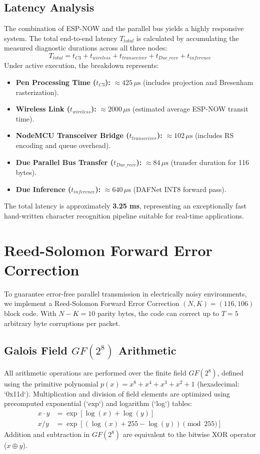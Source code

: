 \documentclass[12pt,a4paper]{article}
\begin{document}
\subsection{Latency Analysis}
The combination of ESP-NOW and the parallel bus yields a highly responsive system. The total end-to-end latency $T_{total}$ is calculated by accumulating the measured diagnostic durations across all three nodes:
\begin{equation}
    T_{total} = t_{C3} + t_{wireless} + t_{transceiver} + t_{Due\_recv} + t_{inference}
\end{equation}
Under active execution, the breakdown represents:
\begin{itemize}
    \item \textbf{Pen Processing Time ($t_{C3}$):} $\approx 425\,\mu\text{s}$ (includes projection and Bresenham rasterization).
    \item \textbf{Wireless Link ($t_{wireless}$):} $\approx 2000\,\mu\text{s}$ (estimated average ESP-NOW transit time).
    \item \textbf{NodeMCU Transceiver Bridge ($t_{transceiver}$):} $\approx 102\,\mu\text{s}$ (includes RS encoding and queue overhead).
    \item \textbf{Due Parallel Bus Transfer ($t_{Due\_recv}$):} $\approx 84\,\mu\text{s}$ (transfer duration for 116 bytes).
    \item \textbf{Due Inference ($t_{inference}$):} $\approx 640\,\mu\text{s}$ (DAFNet INT8 forward pass).
\end{itemize}
The total latency is approximately \textbf{3.25 ms}, representing an exceptionally fast hand-written character recognition pipeline suitable for real-time applications.

\section{Reed-Solomon Forward Error Correction}
To guarantee error-free parallel transmission in electrically noisy environments, we implement a Reed-Solomon Forward Error Correction $(N, K) = (116, 106)$ block code. With $N - K = 10$ parity bytes, the code can correct up to $T = 5$ arbitrary byte corruptions per packet.

\subsection{Galois Field $GF(2^8)$ Arithmetic}
All arithmetic operations are performed over the finite field $GF(2^8)$, defined using the primitive polynomial $p(x) = x^8 + x^4 + x^3 + x^2 + 1$ (hexadecimal: `0x11d`). Multiplication and division of field elements are optimized using precomputed exponential (`exp`) and logarithm (`log`) tables:
\begin{align}
    x \cdot y &= \exp \left[ \log(x) + \log(y) \right] \\
    x / y &= \exp \left[ \left( \log(x) + 255 - \log(y) \right) \pmod{255} \right]
\end{align}
Addition and subtraction in $GF(2^8)$ are equivalent to the bitwise XOR operator ($x \oplus y$).
\end{document}
